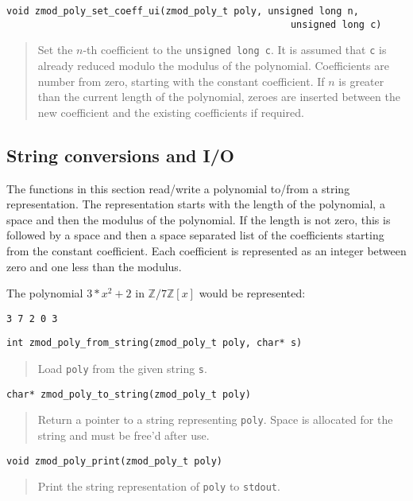 \documentclass[a4paper,10pt]{article}
\newcommand{\Z}{\mathbb{Z}}
\newcommand{\code}{\lstinline}
\begin{document}
\begin{lstlisting}
void zmod_poly_set_coeff_ui(zmod_poly_t poly, unsigned long n, 
                                                  unsigned long c)
\end{lstlisting}
\begin{quote}
Set the $n$-th coefficient to the \code{unsigned long c}. It is assumed that \code{c} is already reduced modulo the modulus of the polynomial. Coefficients are number from zero, starting with the constant coefficient. If $n$ is greater than the current length of the polynomial, zeroes are inserted between the new coefficient and the existing coefficients if required.
\end{quote}

\subsection{String conversions and I/O}
The functions in this section read/write a polynomial to/from a string representation. The representation starts with the length of the polynomial, a space and then the modulus of the polynomial. If the length is not zero, this is followed by a space and then a space separated list of the coefficients starting from the constant coefficient. Each coefficient is represented as an integer between zero and one less than the modulus.

The polynomial $3*x^2+2$ in $\Z/7\Z[x]$ would be represented:

\begin{lstlisting}
3 7 2 0 3
\end{lstlisting}

\begin{lstlisting}
int zmod_poly_from_string(zmod_poly_t poly, char* s)
\end{lstlisting}
\begin{quote}
Load \code{poly} from the given string \code{s}.
\end{quote}

\begin{lstlisting}
char* zmod_poly_to_string(zmod_poly_t poly)
\end{lstlisting}
\begin{quote}
Return a pointer to a string representing \code{poly}. Space is allocated for the string and must be free'd after use.
\end{quote}

\begin{lstlisting}
void zmod_poly_print(zmod_poly_t poly)
\end{lstlisting}
\begin{quote}
Print the string representation of \code{poly} to \code{stdout}.
\end{quote}
\end{document}

